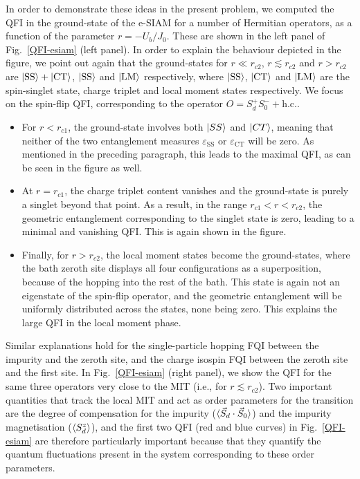 \documentclass{iopart}
\begin{document}
In order to demonstrate these ideas in the present problem, we computed the QFI in the ground-state of the e-SIAM for a number of Hermitian operators, as a function of the parameter \(r=-U_b/J_0\).
These are shown in the left panel of Fig.~\eqref{QFI-esiam} (left panel). 
In order to explain the behaviour depicted in the figure, we point out again that the ground-states for \(r \ll r_{c2}\), \(r \lesssim r_{c2}\) and \(r > r_{c2}\) are \(\ket{\text{SS}} + \ket{\text{CT}}\), \(\ket{\text{SS}}\) and \(\ket{\text{LM}}\) respectively, where \(\ket{\text{SS}}\), \(\ket{\text{CT}}\) and $\ket{\text{LM}}$ are the spin-singlet state, charge triplet and local moment states respectively.
We focus on the spin-flip QFI, corresponding to the operator \(\hat O = S_d^+ S_0^- + \text{h.c.}\).
\begin{itemize}
	\item For \(r < r_{c1}\), the ground-state involves both \(\ket{SS}\) and \(\ket{CT}\), meaning that neither of the two entanglement measures \(\varepsilon_\text{SS}\) or \(\varepsilon_\text{CT}\) will be zero.
	As mentioned in the preceding paragraph, this leads to the maximal QFI, as can be seen in the figure as well.
	\item At \(r = r_{c1}\), the charge triplet content vanishes and the ground-state is purely a singlet beyond that point.
	As a result, in the range \(r_{c1} < r < r_{c2}\), the geometric entanglement corresponding to the singlet state is zero, leading to a minimal and vanishing QFI.
	This is again shown in the figure.
	\item Finally, for \(r > r_{c2}\), the local moment states become the ground-states, where the bath zeroth site displays all four configurations as a superposition, because of the hopping into the rest of the bath.
	This state is again not an eigenstate of the spin-flip operator, and the geometric entanglement will be uniformly distributed across the states, none being zero.
	This explains the large QFI in the local moment phase.
\end{itemize}
Similar explanations hold for the single-particle hopping FQI between the impurity and the zeroth site, and the charge isospin FQI between the zeroth site and the first site.
In Fig.~\eqref{QFI-esiam} (right panel), we show the QFI for the same three operators very close to the MIT (i.e., for $r\lesssim r_{c2}$). 
Two important quantities that track the local MIT and act as order parameters for the transition are the degree of compensation for the impurity (\(\braket{\vec{S}_d\cdot\vec{S}_0}\)) and the impurity magnetisation (\(\braket{S_d^z}\)), and the first two QFI (red and blue curves) in Fig.~\ref{QFI-esiam} are therefore particularly important because that they quantify the quantum fluctuations present in the system corresponding to these order parameters.
\end{document}
